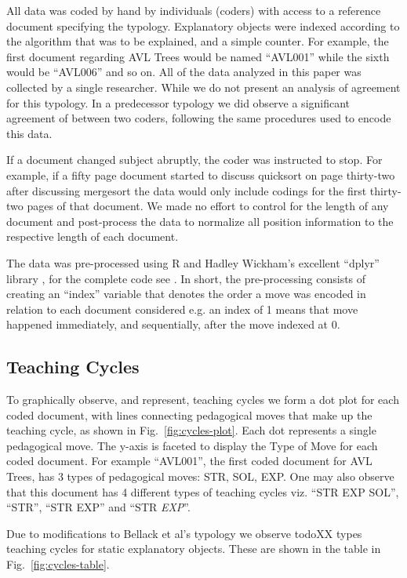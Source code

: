 \documentclass[conference]{IEEEtran}
\begin{document}
All data was coded by hand by individuals (coders) with access to a reference
document specifying the typology. Explanatory objects were indexed according to
the algorithm that was to be explained, and a simple counter. For example, the
first document regarding AVL Trees would be named ``AVL001'' while the sixth
would be ``AVL006'' and so on. All of the data analyzed in this paper was
collected by a single researcher. While we do not present an analysis of
agreement for this typology. In a predecessor typology we did observe a
significant agreement of  between two coders,
following the same procedures used to encode this data.

If a document changed subject abruptly, the coder was instructed to stop. For
example, if a fifty page document started to discuss quicksort on page
thirty-two after discussing mergesort the data would only include codings for
the first thirty-two pages of that document. We made no effort to control for
the length of any document and post-process the data to normalize all position
information to the respective length of each document.

The data was pre-processed using R and Hadley Wickham's excellent ``dplyr'' library
\cite{Dplyr}, for the complete code see . In short, the pre-processing consists of creating an
``index'' variable that denotes the order a move was encoded in relation to each
document considered e.g. an index of 1 means that move happened immediately, and
sequentially, after the move indexed at 0. 


\subsection{Teaching Cycles}

To graphically observe, and represent, teaching cycles we form a dot plot for
each coded document, with lines connecting pedagogical moves that make up the
teaching cycle, as shown in Fig.~\ref{fig:cycles-plot}.
%
Each dot represents a single pedagogical move. The y-axis is faceted to display
the Type of Move for each coded document. For example ``AVL001'', the first
coded document for AVL Trees, has 3 types of pedagogical moves: STR, SOL, EXP.
One may also observe that this document has 4 different types of teaching cycles
viz. ``STR EXP SOL'', ``STR'', ``STR EXP'' and ``STR \emph{EXP}''.


Due to modifications to Bellack et al's typology we observe todo{XX} types
teaching cycles for static explanatory objects. These are shown in the table in
Fig.~\ref{fig:cycles-table}.
\end{document}
